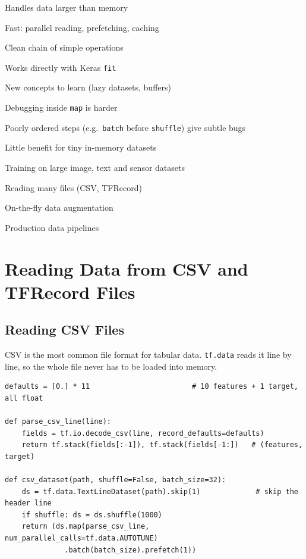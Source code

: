 {\item Handles data larger than memory
 \item Fast: parallel reading, prefetching, caching
 \item Clean chain of simple operations
 \item Works directly with Keras \texttt{fit}}
{\item New concepts to learn (lazy datasets, buffers)
 \item Debugging inside \texttt{map} is harder
 \item Poorly ordered steps (e.g.\ \texttt{batch} before \texttt{shuffle}) give subtle bugs
 \item Little benefit for tiny in-memory datasets}
{\item Training on large image, text and sensor datasets
 \item Reading many files (CSV, TFRecord)
 \item On-the-fly data augmentation
 \item Production data pipelines}

\section{Reading Data from CSV and TFRecord Files}

\subsection{Reading CSV Files}

CSV is the most common file format for tabular data. \texttt{tf.data} reads it line by line, so the whole file never has to be loaded into memory.

\begin{lstlisting}
defaults = [0.] * 11                        # 10 features + 1 target, all float

def parse_csv_line(line):
    fields = tf.io.decode_csv(line, record_defaults=defaults)
    return tf.stack(fields[:-1]), tf.stack(fields[-1:])   # (features, target)

def csv_dataset(path, shuffle=False, batch_size=32):
    ds = tf.data.TextLineDataset(path).skip(1)             # skip the header line
    if shuffle: ds = ds.shuffle(1000)
    return (ds.map(parse_csv_line, num_parallel_calls=tf.data.AUTOTUNE)
              .batch(batch_size).prefetch(1))
\end{lstlisting}

